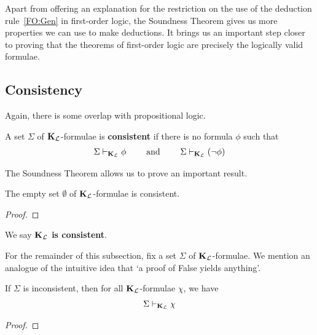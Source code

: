 Apart from offering an explanation for the restriction on the use of the deduction rule~\ref{FO:Gen} in first-order logic, the Soundness Theorem gives us more properties we can use to make deductions. It brings us an important step closer to proving that the theorems of first-order logic are precisely the logically valid formulae.

\subsection{Consistency}

Again, there is some overlap with propositional logic.

\begin{boxdefinition}[Consistency]
    A set $\Sigma$ of $\mathbf{K}_{\mathcal{L}}$-formulae is \textbf{consistent} if there is no formula $\phi$ such that
    \begin{align*}
        \Sigma \vdash_{\mathbf{K}_{\mathcal{L}}} \phi
        \qquad \text{ and } \qquad
        \Sigma \vdash_{\mathbf{K}_{\mathcal{L}}} \left( \neg\phi \right)
    \end{align*}
\end{boxdefinition}

The Soundness Theorem allows us to prove an important result.

\begin{boxtheorem}
    The empty set $\emptyset$ of $\mathbf{K}_{\mathcal{L}}$-formulae is consistent.
\end{boxtheorem}
\begin{proof}
    \sorry
\end{proof}

\begin{boxconvention}
    We say \textbf{$\mathbf{K}_{\mathcal{L}}$ is consistent}.
\end{boxconvention}

For the remainder of this subsection, fix a set $\Sigma$ of $\mathbf{K}_{\mathcal{L}}$-formulae. We mention an analogue of the intuitive idea that `a proof of False yields anything'.

\begin{boxproposition}
    If $\Sigma$ is inconsistent, then for all $\mathbf{K}_{\mathcal{L}}$-formulae $\chi$, we have
    \begin{align*}
        \Sigma \vdash_{\mathbf{K}_{\mathcal{L}}} \chi
    \end{align*}
\end{boxproposition}
\begin{proof}
    \sorry %
\end{proof}

